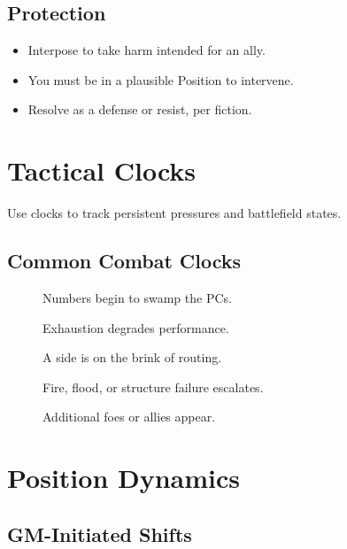 \subsection{Protection}
\label{subsec:protection}

\begin{itemize}
  \item Interpose to take harm intended for an ally.
  \item You must be in a plausible Position to intervene.
  \item Resolve as a defense or resist, per fiction.
\end{itemize}

\section{Tactical Clocks}
\label{sec:tactical-clocks}

Use clocks to track persistent pressures and battlefield states.

\subsection{Common Combat Clocks}
\label{subsec:combat-clocks}

\begin{description}
  \item[] Numbers begin to swamp the PCs. 
  \item[] Exhaustion degrades performance. 
  \item[] A side is on the brink of routing. 
  \item[] Fire, flood, or structure failure escalates. 
  \item[] Additional foes or allies appear. 
\end{description}

\section{Position Dynamics}
\label{sec:position-dynamics}

\subsection{GM-Initiated Shifts}
\label{subsec:gm-shifts}

